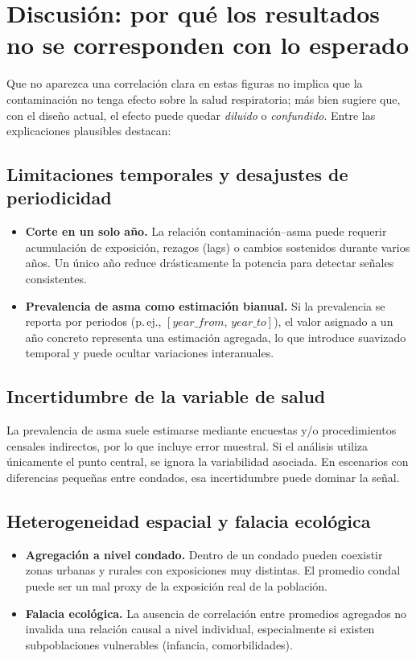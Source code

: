 \section{Discusión: por qué los resultados no se corresponden con lo esperado}
Que no aparezca una correlación clara en estas figuras no implica que la contaminación no tenga efecto sobre
la salud respiratoria; más bien sugiere que, con el diseño actual, el efecto puede quedar \textit{diluido} o
\textit{confundido}. Entre las explicaciones plausibles destacan:

\subsection{Limitaciones temporales y desajustes de periodicidad}
\begin{itemize}
  \item \textbf{Corte en un solo año.} La relación contaminación--asma puede requerir acumulación de exposición,
  rezagos (lags) o cambios sostenidos durante varios años. Un único año reduce drásticamente la potencia para
  detectar señales consistentes.
  \item \textbf{Prevalencia de asma como estimación bianual.} Si la prevalencia se reporta por periodos (p.\,ej.,
  $[year\_from,\,year\_to]$), el valor asignado a un año concreto representa una estimación agregada, lo que
  introduce suavizado temporal y puede ocultar variaciones interanuales.
\end{itemize}

\subsection{Incertidumbre de la variable de salud}
La prevalencia de asma suele estimarse mediante encuestas y/o procedimientos censales indirectos, por lo que
incluye error muestral. Si el análisis utiliza únicamente el punto central, se ignora la variabilidad asociada.
En escenarios con diferencias pequeñas entre condados, esa incertidumbre puede dominar la señal.

\subsection{Heterogeneidad espacial y falacia ecológica}
\begin{itemize}
  \item \textbf{Agregación a nivel condado.} Dentro de un condado pueden coexistir zonas urbanas y rurales con
  exposiciones muy distintas. El promedio condal puede ser un mal proxy de la exposición real de la población.
  \item \textbf{Falacia ecológica.} La ausencia de correlación entre promedios agregados no invalida una relación
  causal a nivel individual, especialmente si existen subpoblaciones vulnerables (infancia, comorbilidades).
\end{itemize}

